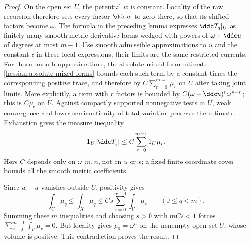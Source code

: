 \begin{proof}
On the open set $U$, the potential $w$ is constant. Locality of
the raw recursion therefore sets every factor $\ddc w$ to zero
there, so that its shifted factors become $\omega$.
The formula in the preceding lemma expresses $\ddc T_q|_U$ as
finitely many smooth metric-derivative forms wedged with powers
of $\omega+\ddc u$ of degrees at most $m-1$.
Use smooth admissible approximations to $u$ and the constant $c$ in
these local expressions; their limits are the same restricted currents.
For those smooth approximations, the absolute mixed-form
estimate \cref{hessian:absolute-mixed-forms} bounds each such term
by a constant times the corresponding positive trace, and therefore
by $C\sum_{r=0}^{m-1}\mu_r$ on $U$ after taking joint limits.
More explicitly, a term with $r$ factors is bounded by
$C(\omega+\ddc u)^r\omega^{n-r}$; this is $C\mu_r$ on $U$.
Against compactly supported nonnegative tests in $U$, weak
convergence and lower semicontinuity of total variation preserve
the estimate. Exhaustion gives the measure inequality
\[
 \mathbf1_U|\ddc T_q|
                 \leq C\sum_{r=0}^{m-1}\mathbf1_U\mu_r.
\]
Here $C$ depends only on $\omega,m,n$, not on $u$ or $s$; a fixed
finite coordinate cover bounds all the smooth metric coefficients.

Since $w-u$ vanishes outside $U$, positivity gives
\[
 \int_U\mu_q\leq\int_X\mu_q
            \leq Cs\sum_{r=0}^{m-1}\int_U\mu_r
                 \qquad(0\leq q<m).
\]
Summing these $m$ inequalities and choosing $s>0$ with $mCs<1$
forces $\sum_{r=0}^{m-1}\int_U\mu_r=0$.
But locality gives $\mu_0=\omega^n$ on the nonempty open set $U$,
whose volume is positive. This contradiction proves the result.
\end{proof}
